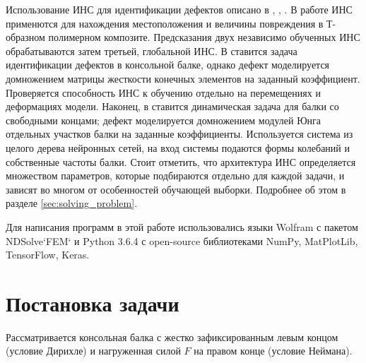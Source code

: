 \documentclass[a4paper,12pt]{article}
\theoremstyle{remark}
\begin{document}
	Использование ИНС для идентификации дефектов описано в \cite{artificial_neural_networks_in_damage_detection}, \cite{randomized_trained_neural_networks}, \cite{multi_stage_neural_networks}. В работе \cite{artificial_neural_networks_in_damage_detection} ИНС применются для нахождения местоположения и величины повреждения в Т-образном полимерном композите. Предсказания двух независимо обученных ИНС обрабатываются затем третьей, глобальной ИНС. В \cite{randomized_trained_neural_networks} ставится задача идентификации дефектов в консольной балке, однако дефект моделируется домножением матрицы жесткости конечных элементов на заданный коэффициент. Проверяется способность ИНС к обучению отдельно на перемещениях и деформациях модели. Наконец, в \cite{multi_stage_neural_networks} ставится динамическая задача для балки со свободными концами; дефект моделируется домножением модулей Юнга отдельных участков балки на заданные коэффициенты. Используется система из целого дерева нейронных сетей, на вход системы подаются формы колебаний и собственные частоты балки. Стоит отметить, что архитектура ИНС определяется множеством параметров, которые подбираются отдельно для каждой задачи, и зависят во многом от особенностей обучающей выборки. Подробнее об этом в разделе \ref{sec:solving_problem}.
	
	Для написания программ в этой работе использовались языки Wolfram с пакетом NDSolve`FEM` и Python 3.6.4 с open-source библиотеками NumPy, MatPlotLib, TensorFlow, Keras.
	
	\newpage
	\section{Постановка задачи}
	\label{sec:formulation_problem}
	
	Рассматривается консольная балка с жестко зафиксированным левым концом (условие Дирихле) и нагруженная силой $F$ на правом конце (условие Неймана).
\end{document}
